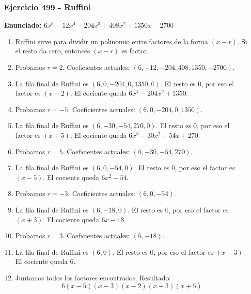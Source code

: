 \documentclass[11pt,a4paper]{article}
\begin{document}
\subsubsection*{Ejercicio 499 - Ruffini}
\textbf{Enunciado:} $ 6 x^{5} - 12 x^{4} - 204 x^{3} + 408 x^{2} + 1350 x - 2700 $\par
\begin{enumerate}[leftmargin=2em]
\item Ruffini sirve para dividir un polinomio entre factores de la forma \((x-r)\). Si el resto da cero, entonces \((x-r)\) es factor.
\item Probamos \(r=2\). Coeficientes actuales: \((6, -12, -204, 408, 1350, -2700)\).
\item La fila final de Ruffini es \((6, 0, -204, 0, 1350, 0)\). El resto es \(0\), por eso el factor es \((x-2)\). El cociente queda \(6 x^{4} - 204 x^{2} + 1350\).
\item Probamos \(r=-5\). Coeficientes actuales: \((6, 0, -204, 0, 1350)\).
\item La fila final de Ruffini es \((6, -30, -54, 270, 0)\). El resto es \(0\), por eso el factor es \((x+5)\). El cociente queda \(6 x^{3} - 30 x^{2} - 54 x + 270\).
\item Probamos \(r=5\). Coeficientes actuales: \((6, -30, -54, 270)\).
\item La fila final de Ruffini es \((6, 0, -54, 0)\). El resto es \(0\), por eso el factor es \((x-5)\). El cociente queda \(6 x^{2} - 54\).
\item Probamos \(r=-3\). Coeficientes actuales: \((6, 0, -54)\).
\item La fila final de Ruffini es \((6, -18, 0)\). El resto es \(0\), por eso el factor es \((x+3)\). El cociente queda \(6 x - 18\).
\item Probamos \(r=3\). Coeficientes actuales: \((6, -18)\).
\item La fila final de Ruffini es \((6, 0)\). El resto es \(0\), por eso el factor es \((x-3)\). El cociente queda \(6\).
\item Juntamos todos los factores encontrados. Resultado: \[\boxed{6 \left(x - 5\right) \left(x - 3\right) \left(x - 2\right) \left(x + 3\right) \left(x + 5\right)}\]
\end{enumerate}

\vspace{0.2cm}
\end{document}
